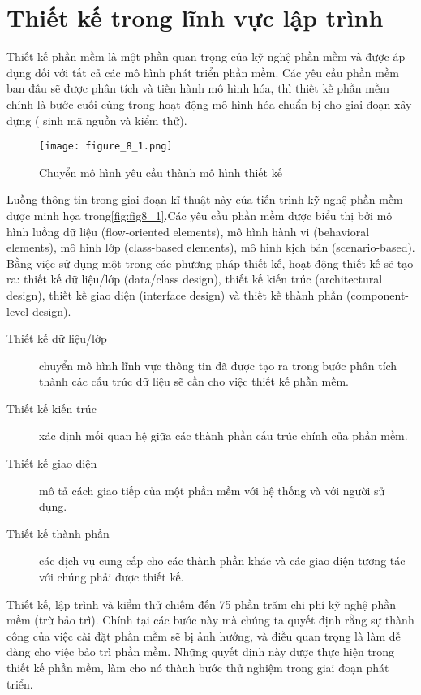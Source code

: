 \documentclass[./../SoftwareEngineering.tex]{subfiles}
\begin{document}
	\section{Thiết kế trong lĩnh vực lập trình}
	Thiết kế phần mềm là một phần quan trọng của kỹ nghệ phần mềm và được áp dụng đối với tất cả các mô hình phát triển phần mềm. Các yêu cầu phần mềm ban đầu sẽ được phân tích và tiến hành mô hình hóa, thì thiết kế phần mềm chính là bước cuối cùng trong hoạt động mô hình hóa chuẩn bị cho giai đoạn xây dựng ( sinh mã nguồn và kiểm thử).

	
	\begin{figure}[!htb]
		\centering
		\texttt{[image: figure\_8\_1.png]}
		\caption{Chuyển mô hình yêu cầu thành mô hình thiết kế}
		\label{fig:fig8_1}
	\end{figure}
	
	Luồng thông tin trong giai đoạn kĩ thuật này của tiến trình kỹ nghệ phần mềm được minh họa trong\autoref{fig:fig8_1}.Các yêu cầu phần mềm được biểu thị bởi mô hình luồng dữ liệu (flow-oriented elements), mô hình hành vi (behavioral elements), mô hình lớp (class-based elements), mô hình kịch bản (scenario-based). Bằng việc sử dụng một trong các phương pháp thiết kế, hoạt động thiết kế sẽ tạo ra:  thiết kế dữ liệu/lớp (data/class design), thiết kế kiến trúc (architectural design), thiết kế giao diện (interface design) và thiết kế thành phần (component-level design).
	

	\begin{description}
		\item[Thiết kế dữ liệu/lớp] chuyển mô hình lĩnh vực thông tin đã được tạo ra trong bước phân tích thành các cấu trúc dữ liệu sẽ cần cho việc thiết kế phần mềm. 
		\item[Thiết kế kiến trúc] xác định mối quan hệ giữa các thành phần cấu trúc chính của phần mềm.
		\item[Thiết kế giao diện] mô tả cách giao tiếp của một phần mềm với hệ thống và với người sử dụng. 
		\item[Thiết kế thành phần] các dịch vụ cung cấp cho các thành phần khác và các giao diện tương tác với chúng phải được thiết kế. 
	\end{description}
	
	
	Thiết kế, lập trình và kiểm thử chiếm đến 75 phần trăm chi phí kỹ nghệ phần mềm (trừ bảo trì). Chính tại các bước này mà chúng ta quyết định rằng sự thành công của việc cài đặt phần mềm sẽ bị ảnh hưởng, và điều quan trọng là làm dễ dàng cho việc bảo trì phần mềm. Những quyết định này được thực hiện trong thiết kế phần mềm, làm cho nó thành bước thử nghiệm trong giai đoạn phát triển.
	
\end{document}
